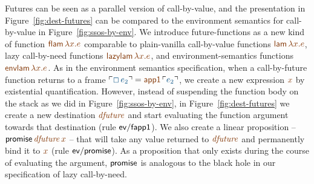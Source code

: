 Futures can be seen as a parallel version of call-by-value, and the
presentation in Figure~\ref{fig:dest-futures} can be compared to the
environment semantics for call-by-value in
Figure~\ref{fig:ssos-by-env}. We introduce future-functions as a new
kind of function $\lf{{\sf flam}\,\lambda x.e}$ comparable to plain-vanilla
call-by-value functions $\lf{{\sf lam}\,\lambda x.e}$, lazy call-by-need
functions $\lf{{\sf lazylam}\,\lambda x.e}$, and environment-semantics
functions $\lf{{\sf envlam}\,\lambda x.e}$. As in the environment semantics
specification, when a call-by-future function returns to a frame
$\interp{\Box\,e_2} = \lf{{\sf app1}\,\interp{e_2}}$,
 we create a new expression $\lf{x}$
by existential quantification. However, instead of suspending the
function body on the stack as we did in Figure~\ref{fig:ssos-by-env},
in Figure~\ref{fig:dest-futures} we create a new destination $\lf{\it
  dfuture}$ and start evaluating the function argument towards that
destination (rule ${\sf ev/fapp1}$). We also create a linear
proposition -- ${\sf promise}\,\lf{\it dfuture}\,\lf{x}$ -- that will take
any value returned to $\lf{\it dfuture}$ and permanently bind it to $\lf{x}$
(rule ${\sf ev/promise}$). As a proposition that only exists during
the course of evaluating the argument, ${\sf promise}$ is analogous to
the black hole in our specification of lazy call-by-need.

